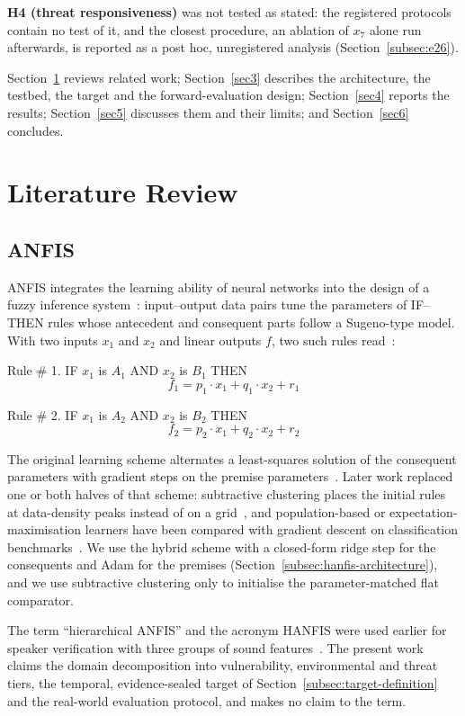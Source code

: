 \documentclass[referee,lineno,pdflatex,sn-basic]{sn-jnl}%
\theoremstyle{thmstyleone}%
\theoremstyle{thmstyletwo}%
\theoremstyle{thmstylethree}%
\begin{document}
\textbf{H4 (threat responsiveness)} was not tested as stated: the registered protocols contain no test of it, and the closest procedure, an ablation of $x_7$ alone run afterwards, is reported as a post hoc, unregistered analysis (Section~\ref{subsec:e26}).

Section~\ref{sec2} reviews related work; Section~\ref{sec3} describes the architecture, the testbed, the target and the forward-evaluation design; Section~\ref{sec4} reports the results; Section~\ref{sec5} discusses them and their limits; and Section~\ref{sec6} concludes.


\section{Literature Review}\label{sec2}
\subsection{ANFIS}\label{subsec1}
ANFIS integrates the learning ability of neural networks into the design of a fuzzy inference system~\citep{jang1993anfis}: input--output data pairs tune the parameters of IF--THEN rules whose antecedent and consequent parts follow a Sugeno-type model. With two inputs $x_1$ and $x_2$ and linear outputs $f$, two such rules read~\citep{jang1993anfis}:

Rule \# 1. IF $x_1$ is $A_1$ AND $x_2$ is $B_1$ THEN
$$f_1 = p_1 \cdot x_1 + q_1 \cdot x_2 + r_1$$

Rule \# 2. IF $x_1$ is $A_2$ AND $x_2$ is $B_2$ THEN
$$f_2 = p_2 \cdot x_1 + q_2 \cdot x_2 + r_2$$

The original learning scheme alternates a least-squares solution of the consequent parameters with gradient steps on the premise parameters~\citep{jang1993anfis}. Later work replaced one or both halves of that scheme: subtractive clustering places the initial rules at data-density peaks instead of on a grid~\citep{chiu1994subtractive}, and population-based or expectation-maximisation learners have been compared with gradient descent on classification benchmarks~\citep{jabeen2023anfis}. We use the hybrid scheme with a closed-form ridge step for the consequents and Adam for the premises (Section~\ref{subsec:hanfis-architecture}), and we use subtractive clustering only to initialise the parameter-matched flat comparator.

The term ``hierarchical ANFIS'' and the acronym HANFIS were used earlier for speaker verification with three groups of sound features~\citep{soozanchi2010hanfis}. The present work claims the domain decomposition into vulnerability, environmental and threat tiers, the temporal, evidence-sealed target of Section~\ref{subsec:target-definition} and the real-world evaluation protocol, and makes no claim to the term.
\end{document}

